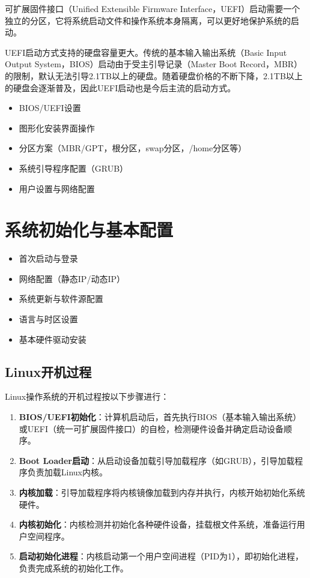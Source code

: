 \documentclass[12pt,UTF8]{ctexbook}
\begin{document}
可扩展固件接口（Unified Extensible Firmware Interface，UEFI）启动需要一个独立的分区，它将系统启动文件和操作系统本身隔离，可以更好地保护系统的启动。

UEFI启动方式支持的硬盘容量更大。传统的基本输入输出系统（Basic Input Output System，BIOS）启动由于受主引导记录（Master Boot Record，MBR）的限制，默认无法引导2.1TB以上的硬盘。随着硬盘价格的不断下降，2.1TB以上的硬盘会逐渐普及，因此UEFI启动也是今后主流的启动方式。

\begin{itemize}
    \item BIOS/UEFI设置
    \item 图形化安装界面操作
    \item 分区方案（MBR/GPT，根分区，swap分区，/home分区等）
    \item 系统引导程序配置（GRUB）
    \item 用户设置与网络配置
\end{itemize}

\section{系统初始化与基本配置}
\begin{itemize}
    \item 首次启动与登录
    \item 网络配置（静态IP/动态IP）
    \item 系统更新与软件源配置
    \item 语言与时区设置
    \item 基本硬件驱动安装
\end{itemize}

\subsection{Linux开机过程}
Linux操作系统的开机过程按以下步骤进行：

\begin{enumerate}
    \item \textbf{BIOS/UEFI初始化}：计算机启动后，首先执行BIOS（基本输入输出系统）或UEFI（统一可扩展固件接口）的自检，检测硬件设备并确定启动设备顺序。
    \item \textbf{Boot Loader启动}：从启动设备加载引导加载程序（如GRUB），引导加载程序负责加载Linux内核。
    \item \textbf{内核加载}：引导加载程序将内核镜像加载到内存并执行，内核开始初始化系统硬件。
    \item \textbf{内核初始化}：内核检测并初始化各种硬件设备，挂载根文件系统，准备运行用户空间程序。
    \item \textbf{启动初始化进程}：内核启动第一个用户空间进程（PID为1），即初始化进程，负责完成系统的初始化工作。
\end{enumerate}
\end{document}

